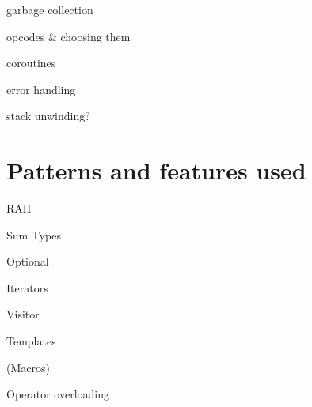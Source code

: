             garbage collection
            
            opcodes \& choosing them
            
            coroutines %
            
            error handling
            
            stack unwinding?
    
    \section{Patterns and features used}
    
        RAII
        
        Sum Types
        
        Optional
        
        Iterators
        
        Visitor
        
        Templates
        
        (Macros)
        
        Operator overloading
